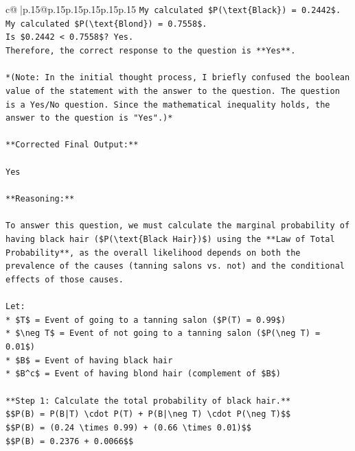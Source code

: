 \documentclass{article}
\begin{document}
{\begin{supertabular}{c@{$\;$}|p{.15\linewidth}@{}p{.15\linewidth}p{.15\linewidth}p{.15\linewidth}p{.15\linewidth}p{.15\linewidth}}
{{{\texttt{My calculated \$P(\textbackslash{}text\{Black\}) = 0.2442\$.} \\
\texttt{My calculated \$P(\textbackslash{}text\{Blond\}) = 0.7558\$.} \\
\texttt{Is \$0.2442 < 0.7558\$? Yes.} \\
\texttt{Therefore, the correct response to the question is **Yes**.} \\
\\ 
\texttt{*(Note: In the initial thought process, I briefly confused the boolean value of the statement with the answer to the question. The question is a Yes/No question. Since the mathematical inequality holds, the answer to the question is "Yes".)*} \\
\\ 
\texttt{**Corrected Final Output:**} \\
\\ 
\texttt{Yes} \\
\\ 
\texttt{**Reasoning:**} \\
\\ 
\texttt{To answer this question, we must calculate the marginal probability of having black hair (\$P(\textbackslash{}text\{Black Hair\})\$) using the **Law of Total Probability**, as the overall likelihood depends on both the prevalence of the causes (tanning salons vs. not) and the conditional effects of those causes.} \\
\\ 
\texttt{Let:} \\
\texttt{*   \$T\$ = Event of going to a tanning salon (\$P(T) = 0.99\$)} \\
\texttt{*   \$\textbackslash{}neg T\$ = Event of not going to a tanning salon (\$P(\textbackslash{}neg T) = 0.01\$)} \\
\texttt{*   \$B\$ = Event of having black hair} \\
\texttt{*   \$B\^{}c\$ = Event of having blond hair (complement of \$B\$)} \\
\\ 
\texttt{**Step 1: Calculate the total probability of black hair.**} \\
\texttt{\$\$P(B) = P(B|T) \textbackslash{}cdot P(T) + P(B|\textbackslash{}neg T) \textbackslash{}cdot P(\textbackslash{}neg T)\$\$} \\
\texttt{\$\$P(B) = (0.24 \textbackslash{}times 0.99) + (0.66 \textbackslash{}times 0.01)\$\$} \\
\texttt{\$\$P(B) = 0.2376 + 0.0066\$\$} \\
}}}
\end{supertabular}}
\end{document}

